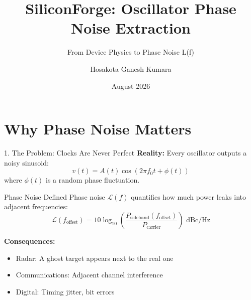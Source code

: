 \documentclass[aspectratio=169, 11pt]{beamer}
\title[SiliconForge]{SiliconForge: Oscillator Phase Noise Extraction}
\subtitle{From Device Physics to Phase Noise L(f)}
\author{Hosakota Ganesh Kumara}
\date{August 2026}
\begin{document}
\begin{frame}
\titlepage
\end{frame}


\section{Why Phase Noise Matters}

\begin{frame}{1. The Problem: Clocks Are Never Perfect}
    \textbf{Reality:} Every oscillator outputs a noisy sinusoid:
    \[ v(t) = A(t)\cos(2\pi f_0 t + \phi(t)) \]
    where $\phi(t)$ is a random phase fluctuation.

    \vspace{0.5em}
    \begin{block}{Phase Noise Defined}
        Phase noise $\mathcal{L}(f)$ quantifies how much power leaks into adjacent frequencies:
        \[ \mathcal{L}(f_{\text{offset}}) = 10\log_{10}\left(\frac{P_{\text{sideband}}(f_{\text{offset}})}{P_{\text{carrier}}}\right) \text{ dBc/Hz} \]
    \end{block}

    \vspace{0.5em}
    \textbf{Consequences:}
    \begin{itemize}
        \item Radar: A ghost target appears next to the real one
        \item Communications: Adjacent channel interference
        \item Digital: Timing jitter, bit errors
    \end{itemize}
\end{frame}
\end{document}
